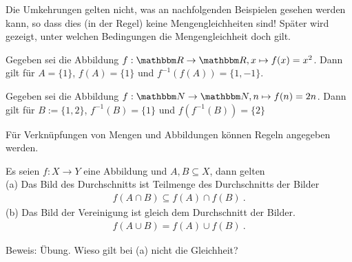 \begin{Unit}[Anmerkung] 
Die Umkehrungen gelten nicht, was an nachfolgenden Beispielen gesehen werden
kann, so dass dies (in der Regel) keine Mengengleichheiten sind! Später wird
gezeigt, unter welchen Bedingungen die Mengengleichheit doch gilt.
\end{Unit} 

\begin{Unit}[Beispiel] 
  Gegeben sei die Abbildung $f: \RR \rightarrow \RR, x \mapsto f(x) = x^2$. 
  Dann gilt für $A = \{1\}$, $f(A) = \{1\}$ und $f^{-1}(f(A)) = \{1, -1\}$.
\end{Unit}

\begin{Unit}[Beispiel] 
  Gegeben sei die Abbildung $f: \NN \rightarrow \NN, n \mapsto f(n) = 2n$. 
  Dann gilt für $B := \{1, 2\}$, $f^{-1}(B) = \{1\}$ und 
  $f(f^{-1}(B)) = \{2\}$
\end{Unit}

\begin{Unit}[Bemerkung]
Für Verknüpfungen von Mengen und Abbildungen können Regeln angegeben werden.

\begin{Bemerkung}
Es seien $f: X \rightarrow Y$ eine Abbildung und $A, B \subseteq X$, dann gelten 
\\
(a) Das Bild des Durchschnitts ist Teilmenge des Durchschnitts der Bilder
  \begin{align}
    f(A \cap B) \subseteq f(A) \cap f(B) \ .
  \end{align}
(b) Das Bild der Vereinigung ist gleich dem Durchschnitt der Bilder.
  \begin{align}
    f(A \cup B) = f(A) \cup f(B) \ .
  \end{align}
\end{Bemerkung}

Beweis: Übung. Wieso gilt bei (a) nicht die Gleichheit?
\end{Unit}

